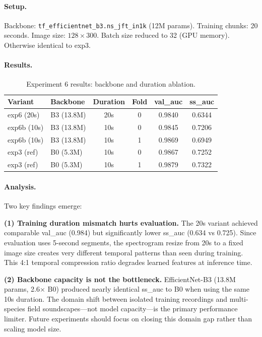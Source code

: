 \paragraph{Setup.}
Backbone: \texttt{tf\_efficientnet\_b3.ns\_jft\_in1k} (12M params).
Training chunks: 20 seconds. Image size: $128 \times 300$.
Batch size reduced to 32 (GPU memory). Otherwise identical to exp3.

\paragraph{Results.}

\begin{table}[h]
\centering
\caption{Experiment 6 results: backbone and duration ablation.}
\label{tab:exp6}
\begin{tabular}{llcccc}
\hline
\textbf{Variant} & \textbf{Backbone} & \textbf{Duration} & \textbf{Fold} & \textbf{val\_auc} & \textbf{ss\_auc} \\
\hline
exp6 (20s)  & B3 (13.8M) & 20s & 0 & 0.9840 & 0.6344 \\
exp6b (10s) & B3 (13.8M) & 10s & 0 & 0.9845 & 0.7206 \\
exp6b (10s) & B3 (13.8M) & 10s & 1 & 0.9869 & 0.6949 \\
\hline
exp3 (ref)  & B0 (5.3M)  & 10s & 0 & 0.9867 & 0.7252 \\
exp3 (ref)  & B0 (5.3M)  & 10s & 1 & 0.9879 & 0.7322 \\
\hline
\end{tabular}
\end{table}

\paragraph{Analysis.}
Two key findings emerge:

\textbf{(1) Training duration mismatch hurts evaluation.}
The 20s variant achieved comparable val\_auc (0.984) but significantly lower
ss\_auc (0.634 vs 0.725). Since evaluation uses 5-second segments, the
spectrogram resize from 20s to a fixed image size creates very different
temporal patterns than seen during training. This 4:1 temporal compression
ratio degrades learned features at inference time.

\textbf{(2) Backbone capacity is not the bottleneck.}
EfficientNet-B3 (13.8M params, 2.6$\times$ B0) produced nearly identical
ss\_auc to B0 when using the same 10s duration. The domain shift between
isolated training recordings and multi-species field soundscapes---not model
capacity---is the primary performance limiter. Future experiments should focus
on closing this domain gap rather than scaling model size.

